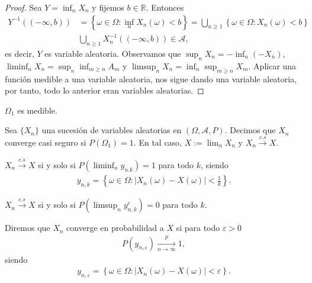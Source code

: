 \begin{proof}
    Sea $Y = \inf_n X_n$ y fijemos $b \in \mathbb{R}$. Entonces
    \begin{align*}
        Y^{-1}((-\infty,b)) &= \left\{ \omega \in \Omega : \inf_n X_n(\omega) < b  \right\} = \bigcup_{n \ge 1} \left\{ \omega \in \Omega : X_n(\omega) < b  \right\} \\
        & \bigcup_{n \ge 1} X_n^{-1}((-\infty,b)) \in \mathcal{A},
    \end{align*}
    es decir, $Y$ es variable aleatoria. Observamos que $\sup_n X_n = - \inf_{n} (-X_n)$, \newline$\liminf_n X_n = \sup_n \inf_{m \ge n} A_m$ y $\limsup_n X_n = \inf_n \sup_{m \ge n} X_m$. Aplicar una función medible a una variable aleatoria, nos sigue dando una variable aleatoria, por tanto, todo lo anterior eran variables aleatorias.
\end{proof}

\begin{cor}
    $\Omega_1$ es medible.
\end{cor}

\begin{defi}
    Sea $\{X_n\}$ una sucesión de variables aleatorias en $(\Omega, \mathcal{A}, P)$. Decimos que $X_n$ converge casi seguro si $P(\Omega_1) = 1$. En tal caso, $X:= \lim_n X_n$ y $X_n \xrightarrow[]{c.s} X$.
\end{defi}

\begin{teo}
    $X_n \xrightarrow[]{c.s} X$ si y solo si $P(\liminf_n y_{n.k}) = 1$ para todo $k$, siendo
    \begin{align*}
        y_{n,k} = \left\{ \omega \in \Omega : |X_n(\omega) - X(\omega)| < \frac{1}{k} \right\}.
    \end{align*}
\end{teo}

\begin{teo}
    $X_n \xrightarrow[]{c.s} X$ si y solo si $P(\limsup_n y_{n,k}^c) = 0$ para todo $k$.
\end{teo}

\begin{defi}
    Diremos que $X_n$ converge en probabilidad a $X$ si para todo $\varepsilon > 0$ 
    \begin{align*}
        P(y_{n,\varepsilon}) \xrightarrow[n\to \infty]{p} 1,
    \end{align*}
    siendo
    \begin{align*}
        y_{n,\varepsilon} = \left\{ \omega \in \Omega : |X_n(\omega) - X(\omega)| < \varepsilon \right\}.
    \end{align*}
\end{defi}

